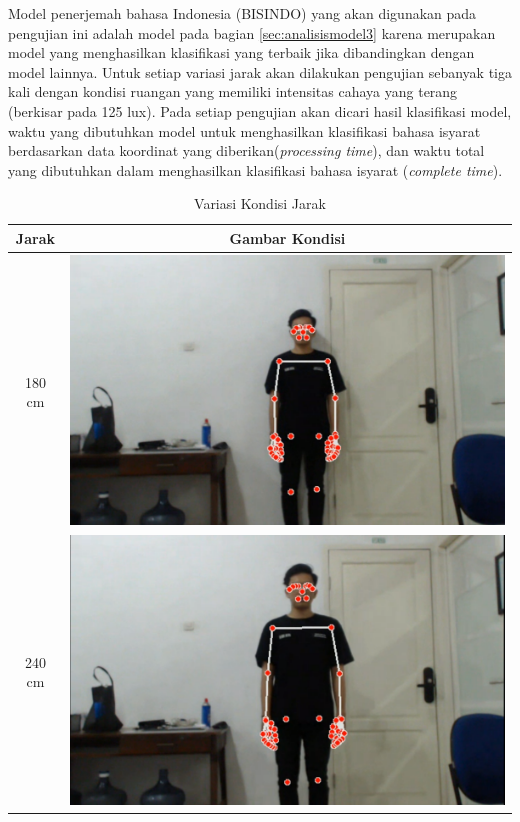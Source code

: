 Model penerjemah bahasa Indonesia (BISINDO) yang akan digunakan pada pengujian ini adalah model pada bagian \ref{sec:analisismodel3} karena merupakan model yang menghasilkan klasifikasi yang terbaik jika dibandingkan dengan model lainnya. Untuk setiap variasi jarak akan dilakukan pengujian sebanyak tiga kali dengan kondisi ruangan yang memiliki intensitas cahaya yang terang (berkisar pada 125 lux). Pada setiap pengujian akan dicari hasil klasifikasi model, waktu yang dibutuhkan model untuk menghasilkan klasifikasi bahasa isyarat berdasarkan data koordinat yang diberikan(\emph{processing time}), dan waktu total yang dibutuhkan dalam menghasilkan klasifikasi bahasa isyarat (\emph{complete time}).  

\begin{longtable}{|c|c|}
  \caption{Variasi Kondisi Jarak}
  \label{tb:kondisijarak}                                   \\
  \hline
  \rowcolor[HTML]{C0C0C0}
  \textbf{Jarak} & \textbf{Gambar Kondisi}  \\
  \hline
  180 cm            &  \includegraphics[scale=0.15]{gambar/bab4-jarak180.png}                \\
  \hline
  240 cm            & \includegraphics[scale=0.15]{gambar/bab4-jarak240.png}                 \\

\end{longtable}
